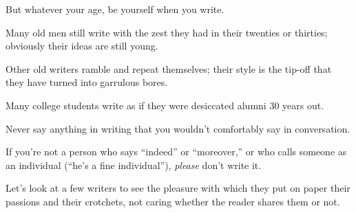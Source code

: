 \documentclass{book}
\numberwithin{equation}{section}
\begin{document}
%
But whatever your age, be yourself when you write.

Many old men still write with the zest they had in their twenties or thirties; obviously their ideas are still young.

Other old writers ramble and repeat themselves; their style is the tip-off that they have turned into garrulous bores.

Many college students write as if they were desiccated alumni 30 years out.

Never say anything in writing that you wouldn't comfortably say in conversation.

If you're not a person who says ``indeed'' or ``moreover,'' or who calls someone as an individual (``he's a fine individual''), \textit{please} don't write it.

%
Let's look at a few writers to see the pleasure with which they put on paper their passions and their crotchets, not caring whether the reader shares them or not.
\end{document}
